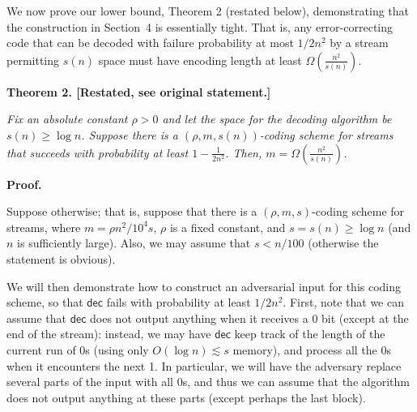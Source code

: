 We now prove our lower bound, Theorem 2 (restated below), demonstrating that the construction in Section 4 is essentially tight. That is, any error-correcting code that can be decoded with failure probability at most $1/2n^{2}$ by a stream permitting $s(n)$ space must have encoding length at least $\Omega\left(\frac{n^{2}}{s(n)}\right)$.\par






\par\medskip\noindent\textbf{
\textbf{Theorem 2}\textbf{.}
[Restated, see original statement.]}\par



\emph{Fix an absolute constant $\rho>0$ and let the space for the decoding algorithm be $s(n)\geq\log n$. Suppose there is a $\left(\rho,m,s(n)\right)$-coding scheme for streams that succeeds with probability at least $1-\frac{1}{2n^{2}}$. Then, $m=\Omega\left(\frac{n^{2}}{s(n)}\right)$.}\par







\par\medskip\noindent\textbf{Proof.}\par




Suppose otherwise; that is, suppose that there is a $(\rho,m,s)$-coding scheme for streams, where $m=\rho n^{2}/10^{4}s$, $\rho$ is a fixed constant, and $s=s(n)\geq\log n$ (and $n$ is sufficiently large). Also, we may assume that $s<n/100$ (otherwise the statement is obvious).\par




We will then demonstrate how to construct an adversarial input for this coding scheme, so that $\mathsf{dec}$ fails with probability at least $1/2n^{2}$. First, note that we can assume that $\mathsf{dec}$ does not output anything when it receives a 0 bit (except at the end of the stream): instead, we may have $\mathsf{dec}$ keep track of the length of the current run of 0s (using only $O(\log n)\lesssim s$ memory), and process all the 0s when it encounters the next 1. In particular, we will have the adversary replace several parts of the input with all 0s, and thus we can assume that the algorithm does not output anything at these parts (except perhaps the last block).\par




